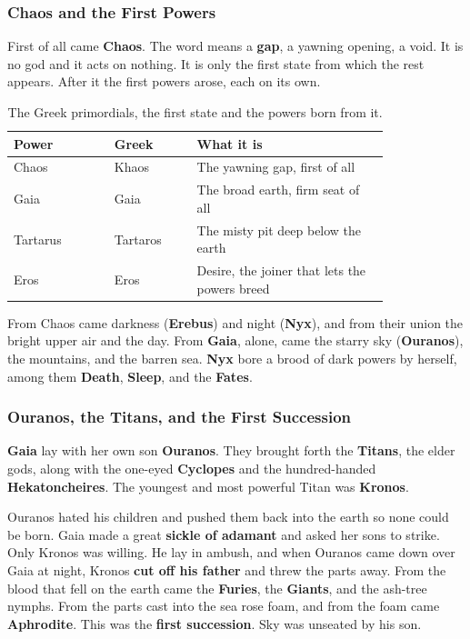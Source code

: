 \subsubsection{Chaos and the First Powers}

First of all came \textbf{Chaos}. The word means a \textbf{gap}, a yawning
opening, a void. It is no god and it acts on nothing. It is only the first state
from which the rest appears. After it the first powers arose, each on its own.

\begin{longtable}{L{0.22\linewidth} L{0.18\linewidth} L{0.42\linewidth}}
\caption{The Greek primordials, the first state and the powers born from it.}\\
\toprule
\textbf{Power} & \textbf{Greek} & \textbf{What it is} \\
\midrule
Chaos & Khaos & The yawning gap, first of all \\
Gaia & Gaia & The broad earth, firm seat of all \\
Tartarus & Tartaros & The misty pit deep below the earth \\
Eros & Eros & Desire, the joiner that lets the powers breed \\
\bottomrule
\end{longtable}

From Chaos came darkness (\textbf{Erebus}) and night (\textbf{Nyx}), and from
their union the bright upper air and the day. From \textbf{Gaia}, alone, came
the starry sky (\textbf{Ouranos}), the mountains, and the barren sea. \textbf{Nyx}
bore a brood of dark powers by herself, among them \textbf{Death}, \textbf{Sleep},
and the \textbf{Fates}.

\subsubsection{Ouranos, the Titans, and the First Succession}

\textbf{Gaia} lay with her own son \textbf{Ouranos}. They brought forth the
\textbf{Titans}, the elder gods, along with the one-eyed \textbf{Cyclopes} and the
hundred-handed \textbf{Hekatoncheires}. The youngest and most powerful Titan was
\textbf{Kronos}.

Ouranos hated his children and pushed them back into the earth so none could be
born. Gaia made a great \textbf{sickle of adamant} and asked her sons to strike.
Only Kronos was willing. He lay in ambush, and when Ouranos came down over Gaia at
night, Kronos \textbf{cut off his father} and threw the parts away. From the blood
that fell on the earth came the \textbf{Furies}, the \textbf{Giants}, and the
ash-tree nymphs. From the parts cast into the sea rose foam, and from the foam came
\textbf{Aphrodite}. This was the \textbf{first succession}. Sky was unseated by his
son.

